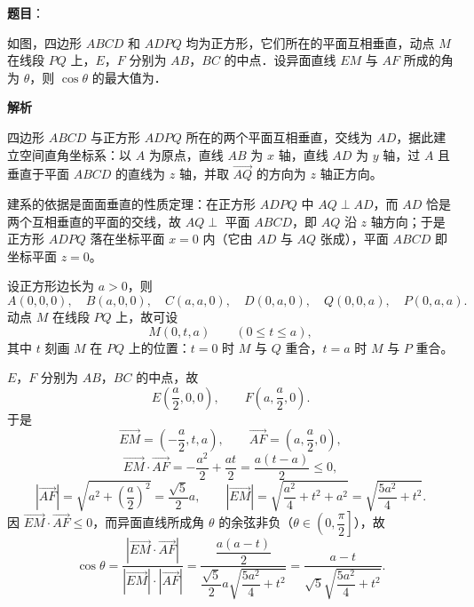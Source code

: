 \begin{answer}

\textbf{题目}：

如图，四边形 \(ABCD\) 和 \(ADPQ\) 均为正方形，它们所在的平面互相垂直，动点 \(M\) 在线段 \(PQ\) 上，\(E\)，\(F\) 分别为 \(AB\)，\(BC\) 的中点．设异面直线 \(EM\) 与 \(AF\) 所成的角为 \(\theta\)，则 \(\cos\theta\) 的最大值为\gkblank{}．
\nopagebreak[4]
\begin{center}\end{center}
\nopagebreak[4]
\textbf{解析}

四边形 \(ABCD\) 与正方形 \(ADPQ\) 所在的两个平面互相垂直，交线为 \(AD\)，据此建立空间直角坐标系：以 \(A\) 为原点，直线 \(AB\) 为 \(x\) 轴，直线 \(AD\) 为 \(y\) 轴，过 \(A\) 且垂直于平面 \(ABCD\) 的直线为 \(z\) 轴，并取 \(\overrightarrow{AQ}\) 的方向为 \(z\) 轴正方向。

建系的依据是面面垂直的性质定理：在正方形 \(ADPQ\) 中 \(AQ\perp AD\)，而 \(AD\) 恰是两个互相垂直的平面的交线，故 \(AQ\perp\) 平面 \(ABCD\)，即 \(AQ\) 沿 \(z\) 轴方向；于是正方形 \(ADPQ\) 落在坐标平面 \(x=0\) 内（它由 \(AD\) 与 \(AQ\) 张成），平面 \(ABCD\) 即坐标平面 \(z=0\)。

设正方形边长为 \(a>0\)，则
\nopagebreak[4]
\[
A(0,0,0),\quad B(a,0,0),\quad C(a,a,0),\quad D(0,a,0),\quad Q(0,0,a),\quad P(0,a,a).
\]
动点 \(M\) 在线段 \(PQ\) 上，故可设
\nopagebreak[4]
\[
M(0,t,a)\qquad(0\leqslant t\leqslant a),
\]
其中 \(t\) 刻画 \(M\) 在 \(PQ\) 上的位置：\(t=0\) 时 \(M\) 与 \(Q\) 重合，\(t=a\) 时 \(M\) 与 \(P\) 重合。

\(E\)，\(F\) 分别为 \(AB\)，\(BC\) 的中点，故
\nopagebreak[4]
\[
E\left(\dfrac{a}{2},0,0\right),\qquad F\left(a,\dfrac{a}{2},0\right).
\]
于是
\nopagebreak[4]
\[
\overrightarrow{EM}=\left(-\dfrac{a}{2},t,a\right),\qquad \overrightarrow{AF}=\left(a,\dfrac{a}{2},0\right),
\]
\nopagebreak[4]
\[
\overrightarrow{EM}\cdot\overrightarrow{AF}=-\dfrac{a^2}{2}+\dfrac{at}{2}=\dfrac{a(t-a)}{2}\leqslant0,
\]
\nopagebreak[4]
\[
\left|\overrightarrow{AF}\right|=\sqrt{a^2+\left(\dfrac{a}{2}\right)^2}=\dfrac{\sqrt5}{2}a,\qquad
\left|\overrightarrow{EM}\right|=\sqrt{\dfrac{a^2}{4}+t^2+a^2}=\sqrt{\dfrac{5a^2}{4}+t^2}.
\]
因 \(\overrightarrow{EM}\cdot\overrightarrow{AF}\leqslant0\)，而异面直线所成角 \(\theta\) 的余弦非负（\(\theta\in\left(0,\dfrac{\pi}{2}\right]\)），故
\nopagebreak[4]
\[
\cos\theta=\dfrac{\left|\overrightarrow{EM}\cdot\overrightarrow{AF}\right|}{\left|\overrightarrow{EM}\right|\cdot\left|\overrightarrow{AF}\right|}
=\dfrac{\dfrac{a(a-t)}{2}}{\dfrac{\sqrt5}{2}a\sqrt{\dfrac{5a^2}{4}+t^2}}
=\dfrac{a-t}{\sqrt5\sqrt{\dfrac{5a^2}{4}+t^2}}.
\]


\end{answer}
